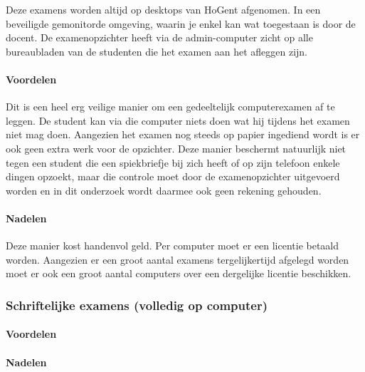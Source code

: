 Deze examens worden altijd op desktops van HoGent afgenomen. In een beveiligde gemonitorde omgeving, waarin je enkel kan wat toegestaan is door de docent. De examenopzichter heeft via de admin-computer zicht op alle bureaubladen van de studenten die het examen aan het afleggen zijn. 

\paragraph{Voordelen}
Dit is een heel erg veilige manier om een gedeeltelijk computerexamen af te leggen. De student kan via die computer niets doen wat hij tijdens het examen niet mag doen. Aangezien het examen nog steeds op papier ingediend wordt is er ook geen extra werk voor de opzichter. Deze manier beschermt natuurlijk niet tegen een student die een spiekbriefje bij zich heeft of op zijn telefoon enkele dingen opzoekt, maar die controle moet door de examenopzichter uitgevoerd worden en in dit onderzoek wordt daarmee ook geen rekening gehouden.

\paragraph{Nadelen}
Deze manier kost handenvol geld. Per computer moet er een licentie betaald worden. Aangezien er een groot aantal examens tergelijkertijd afgelegd worden moet er ook een groot aantal computers over een dergelijke licentie beschikken.


\subsubsection{Schriftelijke examens (volledig op computer)}

\paragraph{Voordelen}


\paragraph{Nadelen}





